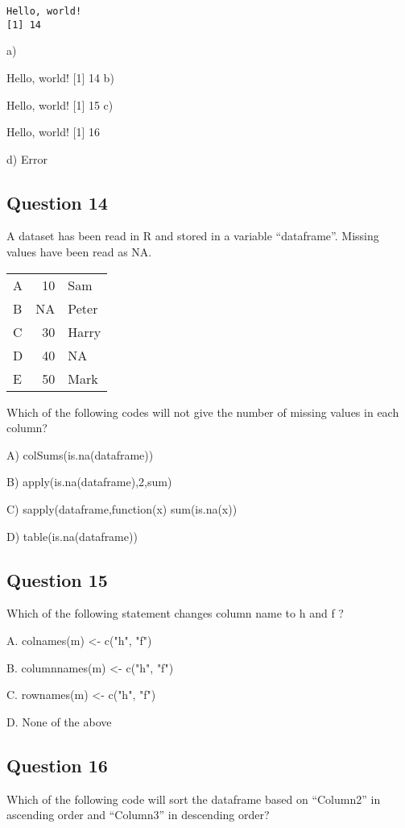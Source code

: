 \documentclass[11pt]{article}
\begin{document}
\begin{verbatim}
Hello, world!
[1] 14
\end{verbatim}


a)

Hello, world!
[1] 14
b)

Hello, world!
[1] 15
c)

Hello, world!
[1] 16

d) Error

\subsection*{Question 14}
\label{sec:org80ff277}
A dataset has been read in R and stored in a variable “dataframe”. Missing values have been read as NA.

\begin{center}
\begin{tabular}{lrl}
A & 10 & Sam\\
B & NA & Peter\\
C & 30 & Harry\\
D & 40 & NA\\
E & 50 & Mark\\
\end{tabular}
\end{center}

Which of the following codes will not give the number of missing values in each column?

A) colSums(is.na(dataframe))

B) apply(is.na(dataframe),2,sum)

C) sapply(dataframe,function(x) sum(is.na(x))

D) table(is.na(dataframe))

\subsection*{Question 15}
\label{sec:orgf3ae54f}
Which of the following statement changes column name to h and f ?

A. colnames(m) <- c("h", "f")

B. columnnames(m) <- c("h", "f")

C. rownames(m) <- c("h", "f")

D. None of the above

\subsection*{Question 16}
\label{sec:orgf3b0655}
Which of the following code will sort the dataframe based on “Column2” in ascending order and “Column3” in descending order?
\end{document}
